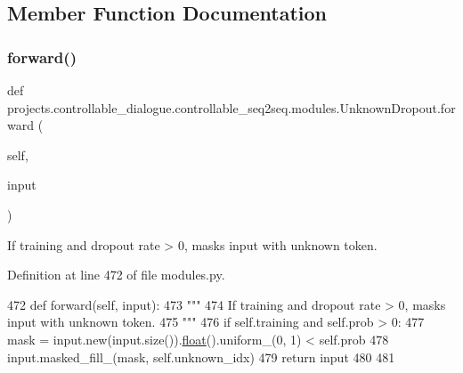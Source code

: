 \subsection{Member Function Documentation}
\mbox{\label{classprojects_1_1controllable__dialogue_1_1controllable__seq2seq_1_1modules_1_1UnknownDropout_aff3bc451d1729384ba040a0ea1e5443c}} 
\subsubsection{\texorpdfstring{forward()}{forward()}}
{\footnotesize\ttfamily def projects.\+controllable\+\_\+dialogue.\+controllable\+\_\+seq2seq.\+modules.\+Unknown\+Dropout.\+forward (\begin{DoxyParamCaption}\item[{}]{self,  }\item[{}]{input }\end{DoxyParamCaption})}

\begin{DoxyVerb}If training and dropout rate > 0, masks input with unknown token.
\end{DoxyVerb}
 

Definition at line 472 of file modules.\+py.


\begin{DoxyCode}
472     \textcolor{keyword}{def }forward(self, input):
473         \textcolor{stringliteral}{"""}
474 \textcolor{stringliteral}{        If training and dropout rate > 0, masks input with unknown token.}
475 \textcolor{stringliteral}{        """}
476         \textcolor{keywordflow}{if} self.training \textcolor{keywordflow}{and} self.prob > 0:
477             mask = input.new(input.size()).\hyperlink{namespaceprojects_1_1controllable__dialogue_1_1make__control__dataset_aa2b7207688c641dbc094ab44eca27113}{float}().uniform\_(0, 1) < self.prob
478             input.masked\_fill\_(mask, self.unknown\_idx)
479         \textcolor{keywordflow}{return} input
480 
481 
\end{DoxyCode}


